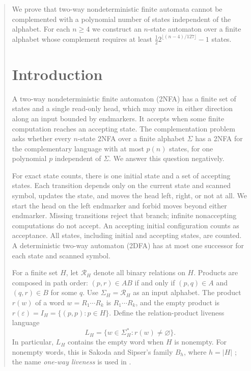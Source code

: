 \begin{abstract}
We prove that two-way nondeterministic finite automata cannot be
complemented with a polynomial number of states independent of the
alphabet. For each $n\ge4$ we construct an $n$-state automaton over a finite
alphabet whose complement requires at least
$\tfrac12 2^{\lfloor(n-4)/127\rfloor}-1$ states.
\section{Introduction}
\label{sec:introduction}

A two-way nondeterministic finite automaton (2NFA) has a finite set of
states and a single read-only head, which may move in either direction
along an input bounded by endmarkers. It accepts when some finite
computation reaches an accepting state. The complementation problem asks
whether every $n$-state 2NFA over a finite alphabet $\Sigma$ has a 2NFA for
the complementary language with at most $p(n)$ states, for one polynomial
$p$ independent of $\Sigma$. We answer this question negatively.

For exact state counts, there is one initial state and a set of accepting
states. Each transition depends only on the current state and scanned
symbol, updates the state, and moves the head left, right, or not at all.
We start the head on the left endmarker and forbid moves beyond either
endmarker. Missing transitions
reject that branch; infinite nonaccepting computations do not accept.
An accepting initial configuration counts as acceptance. All states,
including initial and accepting states, are counted. A deterministic
two-way automaton (2DFA) has at most one successor for each state and
scanned symbol.

For a finite set $H$, let $\mathcal R_H$ denote all binary relations on
$H$. Products are composed in path order:
$(p,r)\in AB$ if and only if $(p,q)\in A$ and $(q,r)\in B$ for some $q$.
Use $\Sigma_H=\mathcal R_H$ as an input alphabet. The product $r(w)$ of a
word $w=R_1\cdots R_k$ is $R_1\cdots R_k$, and the empty product is
$r(\varepsilon)=I_H=\{(p,p):p\in H\}$. Define the relation-product
liveness language
\[
 L_H=\{w\in\Sigma_H^*:r(w)\ne\varnothing\}.
\]
In particular, $L_H$ contains the empty word when $H$ is nonempty.
For nonempty words, this is Sakoda and Sipser's family $B_h$, where
$h=|H|$ \cite[Section~2.1 and Theorem~2.3]{SakodaSipser1978}; the name
\emph{one-way liveness} is used in \cite[Section~2.2]{Kapoutsis2006}.


\end{abstract}
